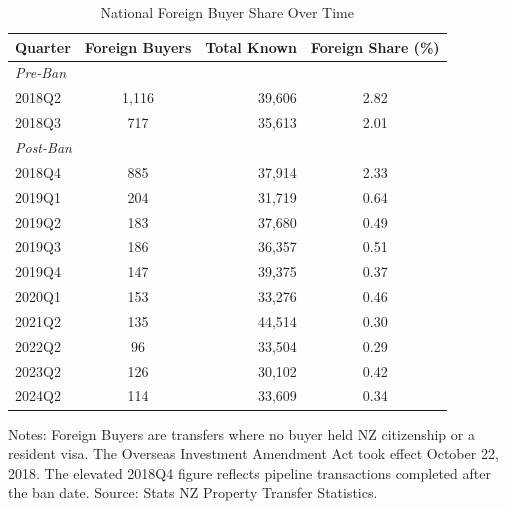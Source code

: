 \begin{table}[H]
\centering
\caption{National Foreign Buyer Share Over Time}
\begin{threeparttable}
\begin{tabular}{lcrc}
\toprule
Quarter & Foreign Buyers & Total Known & Foreign Share (\%) \\
\midrule
\multicolumn{4}{l}{\textit{Pre-Ban}} \\
2018Q2 & 1,116 & 39,606 & 2.82 \\
2018Q3 & 717 & 35,613 & 2.01 \\
\midrule
\multicolumn{4}{l}{\textit{Post-Ban}} \\
2018Q4 & 885 & 37,914 & 2.33 \\
2019Q1 & 204 & 31,719 & 0.64 \\
2019Q2 & 183 & 37,680 & 0.49 \\
2019Q3 & 186 & 36,357 & 0.51 \\
2019Q4 & 147 & 39,375 & 0.37 \\
2020Q1 & 153 & 33,276 & 0.46 \\
2021Q2 & 135 & 44,514 & 0.30 \\
2022Q2 & 96 & 33,504 & 0.29 \\
2023Q2 & 126 & 30,102 & 0.42 \\
2024Q2 & 114 & 33,609 & 0.34 \\
\bottomrule
\end{tabular}
\begin{tablenotes}[flushleft]
\small
\item Notes: Foreign Buyers are transfers where no buyer held NZ citizenship or a resident visa. The Overseas Investment Amendment Act took effect October 22, 2018. The elevated 2018Q4 figure reflects pipeline transactions completed after the ban date. Source: Stats NZ Property Transfer Statistics.
\end{tablenotes}
\end{threeparttable}
\label{tab:national}
\end{table}
